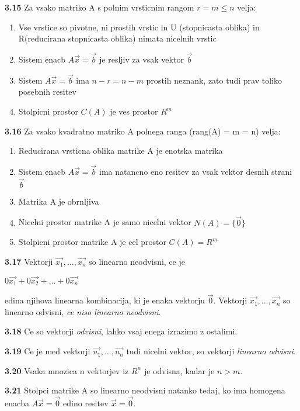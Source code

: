 \documentclass{article}
\begin{document}
\begin{multicols}{2}
	\textbf{3.15} Za vsako matriko A s polnim vrsticnim rangom $r = m \leq n$ velja:
	\begin{enumerate}
		\item Vse vrstice so pivotne, ni prostih vrstic in U (stopnicasta oblika) in R(reducirana stopnicasta oblika) nimata nicelnih vrstic
		\item Sistem enacb $A\vec{x} = \vec{b}$ je resljiv za vsak vektor $\vec{b}$
		\item Sistem $A\vec{x} = \vec{b}$ ima $n-r = n-m$ prostih neznank, zato tudi prav toliko posebnih resitev
		\item Stolpicni prostor $C(A)$ je ves prostor $R^{m}$
	\end{enumerate}

	\textbf{3.16} Za vsako kvadratno matriko A polnega ranga (rang(A) = m = n) velja:
	\begin{enumerate}
		\item Reducirana vrsticna oblika matrike A je enotska matrika
		\item Sistem enacb $A\vec{x} = \vec{b}$ ima natancno eno resitev za vsak vektor desnih strani $\vec{b}$
		\item Matrika A je obrnljiva
		\item Nicelni prostor matrike A je samo nicelni vektor $N(A) = \{\vec{0}\}$
		\item Stolpicni prostor matrike A je cel prostor $C(A) = R^{m}$
	\end{enumerate}

	\textbf{3.17} Vektorji $\vec{x_{1}}, \dots,\vec{x_{n}}$ so linearno neodvisni, ce je
	\begin{center}
		$ 0\vec{x_{1}} + 0\vec{x_{2}} + \dots + 0\vec{x_{n}}$
	\end{center}
	edina njihova linearna kombinacija, ki je enaka vektorju $\vec{0}$. Vektorji $\vec{x_{1}}, \dots,\vec{x_{n}}$ so
	linearno odvisni, \textit{ce niso linearno neodvisni}.

	\textbf{3.18} Ce so vektorji \textit{odvisni}, lahko vsaj enega izrazimo z ostalimi.

	\textbf{3.19} Ce je med vektorji  $\vec{u_{1}}, \dots,\vec{u_{n}}$ tudi nicelni vektor, so
	vektorji \textit{linearno odvisni}.

	\textbf{3.20} Vsaka mnozica n vektorjev iz $R^{n}$ je odvisna, kadar je $n > m $.

	\textbf{3.21} Stolpci matrike A so linearno neodvisni natanko tedaj, ko ima homogena enacba
	$A\vec{x} = \vec{0}$ edino resitev $\vec{x} = \vec{0}$.


\end{multicols}
\end{document}

